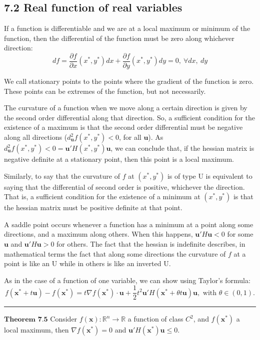 \documentclass[0pt, a4paper]{article}
\begin{document}
\subsection*{7.2 Real function of real variables}

If a function is differentiable and we are at a local maximum or minimum of the function, then the differential of the function must be zero along whichever direction:
$$df=\frac{\partial f}{\partial x}(x^*,y^*)dx+\frac{\partial f}{\partial y}(x^*,y^*)dy=0,\ \forall dx,\ dy$$

We call stationary points to the points where the gradient of the function is zero. These points can be extremes of the function, but not necessarily.

The curvature of a function when we move along a certain direction is given by the second order differential along that direction. So, a sufficient condition for the existence of a maximum is that the second order differential must be negative along all directions ($d^2_\textbf{u}f(x^*,y^*)<0$, for all $\textbf{u}$). As $d^2_\textbf{u}f(x^*,y^*)<0=\textbf{u}'H(x^*,y^*)\textbf{u}$, we can conclude that, if the hessian matrix is negative definite at a stationary point, then this point is a local maximum. 

Similarly, to say that the curvature of $f$ at $(x^*,y^*)$ is of type U is equivalent to saying that the differential of second order is positive, whichever the direction. That is, a sufficient condition for the existence of a minimum at $(x^*,y^*)$ is that the hessian matrix must be positive definite at that point.

A saddle point occurs whenever a function has a minimum at a point along some directions, and a maximum along others. When this happens, $\textbf{u}'H\textbf{u}<0$ for some $\textbf{u}$ and $\textbf{u}'H\textbf{u}>0$ for others. The fact that the hessian is indefinite describes, in mathematical terms the fact that along some directions the curvature of $f$ at a point is like an U while in others is like an inverted U.

As in the case of a function of one variable, we can show using Taylor's formula:
$$f(\textbf{x}^*+t\textbf{u})-f(\textbf{x}^*)=t\nabla f(\textbf{x}^*)\cdot\textbf{u}+\frac{1}{2}t^2\textbf{u}'H(\textbf{x}^*+\theta t\textbf{u})\textbf{u},\text{ with }\theta\in(0,1).$$
\noindent\rule{\textwidth}{1pt}

$\textbf{Theorem 7.5}$ Consider $f(\textbf{x}):\mathbb{R}^n\to\mathbb{R}$ a function of class $C^2$, and $f(\textbf{x}^*)$ a local maximum, then $\nabla f(\textbf{x}^*)=0$ and $\textbf{u}'H(\textbf{x}^*)\textbf{u}\leq0$.
\end{document}
